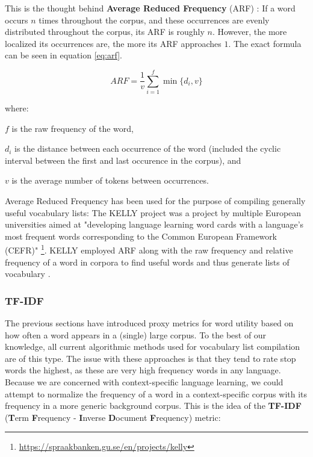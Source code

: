 This is the thought behind \textbf{Average Reduced Frequency} (ARF) \cite{savickyMeasuresWordCommonness2002}:
If a word occurs $n$ times throughout the corpus, and these occurrences are evenly distributed throughout the corpus, its ARF is roughly $n$.
However, the more localized its occurrences are, the more its ARF approaches $1$.
The exact formula can be seen in equation \ref{eq:arf}.

\begin{equation}\label{eq:arf}
	ARF = \frac{1}{v}\sum_{i=1}^{f} \min\{d_i,v\}
\end{equation}

where:

$f$ is the raw frequency of the word,

$d_i$ is the distance between each occurrence of the word (included the cyclic interval between the first and last occurence in the corpus), and

$v$ is the average number of tokens between occurrences.

Average Reduced Frequency has been used for the purpose of compiling generally useful vocabulary lists:
The KELLY project was a project by multiple European universities aimed at "developing language learning word cards with a language's most frequent words corresponding to the Common European Framework (CEFR)" \footnote{\url{https://spraakbanken.gu.se/en/projects/kelly}}.
KELLY employed ARF along with the raw frequency and relative frequency of a word in corpora to find useful words and thus generate lists of vocabulary \cite{kokkinakisCorpusbasedApproachesCreation2011}.

\subsubsection {TF-IDF}
The previous sections have introduced proxy metrics for word utility based on how often a word appears in a (single) large corpus.
To the best of our knowledge, all current algorithmic methods used for vocabulary list compilation are of this type.
The issue with these approaches is that they tend to rate stop words the highest, as these are very high frequency words in any language.
Because we are concerned with context-specific language learning, we could attempt to normalize the frequency of a word in a context-specific corpus with its frequency in a more generic background corpus.
This is the idea of the \textbf{TF-IDF} (\textbf{T}erm \textbf{F}requency - \textbf{I}nverse \textbf{D}ocument \textbf{F}requency)
\cite{qaiserTextMiningUse2018} metric:

